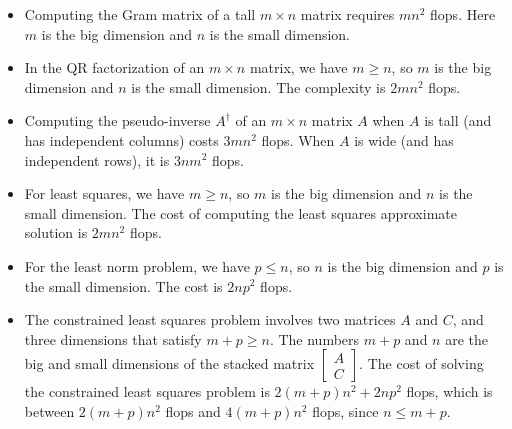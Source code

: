 \begin{itemize}
    \item Computing the Gram matrix of a tall $ m \times n $ matrix requires $ m n^{2} $ flops. Here $ m $ is the big dimension and $ n $ is the small dimension.
    \item In the QR factorization of an $ m \times n $ matrix, we have $ m \geq n $, so $ m $ is the big dimension and $ n $ is the small dimension. The complexity is $ 2 m n^{2} $ flops.
    \item Computing the pseudo-inverse $ A^{\dagger} $ of an $ m \times n $ matrix $ A $ when $ A $ is tall (and has independent columns) costs $ 3 m n^{2} $ flops. When $ A $ is wide (and has independent rows), it is $ 3 n m^{2} $ flops.
    \item For least squares, we have $ m \geq n $, so $ m $ is the big dimension and $ n $ is the small dimension. The cost of computing the least squares approximate solution is $ 2 m n^{2} $ flops.
    \item For the least norm problem, we have $ p \leq n $, so $ n $ is the big dimension and $ p $ is the small dimension. The cost is $ 2 n p^{2} $ flops.
    \item The constrained least squares problem involves two matrices $ A $ and $ C $, and three dimensions that satisfy $ m+p \geq n $. The numbers $ m+p $ and $ n $ are the big and small dimensions of the stacked matrix $ \left[\begin{array}{c}A \\ C\end{array}\right] $. The cost of solving the constrained least squares problem is $ 2(m+p) n^{2}+2 n p^{2} $ flops, which is between $ 2(m+p) n^{2} $ flops and $ 4(m+p) n^{2} $ flops, since $ n \leq m+p $.
\end{itemize}

